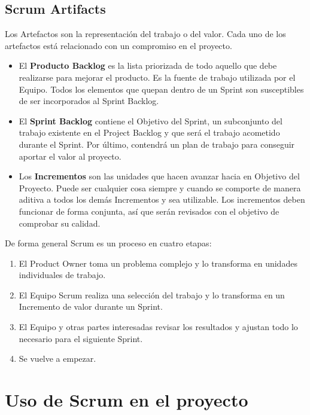 \subsection{Scrum Artifacts}

Los Artefactos son la representación del trabajo o del valor. Cada uno de los artefactos está relacionado con un compromiso en el proyecto.

\begin{itemize}
    \item El \textbf{Producto Backlog} es la lista priorizada de todo aquello que debe realizarse para mejorar el producto. Es la fuente de trabajo utilizada por el Equipo. Todos los elementos que quepan dentro de un Sprint son susceptibles de ser incorporados al Sprint Backlog.
    \item El \textbf{Sprint Backlog} contiene el Objetivo del Sprint, un subconjunto del trabajo existente en el Project Backlog y que será el trabajo acometido durante el Sprint. Por último, contendrá un plan de trabajo para conseguir aportar el valor al proyecto.
    \item Los \textbf{Incrementos} son las unidades que hacen avanzar hacia en Objetivo del Proyecto. Puede ser cualquier cosa siempre y cuando se comporte de manera aditiva a todos los demás Incrementos y sea utilizable. Los incrementos deben funcionar de forma conjunta, así que serán revisados con el objetivo de comprobar su calidad.
\end{itemize}

De forma general Scrum es un proceso en cuatro etapas:

\begin{enumerate}
    \item El Product Owner toma un problema complejo y lo transforma en unidades individuales de trabajo.
    \item El Equipo Scrum realiza una selección del trabajo y lo transforma en un Incremento de valor durante un Sprint.
    \item El Equipo y otras partes interesadas revisar los resultados y ajustan todo lo necesario para el siguiente Sprint.
    \item Se vuelve a empezar.
\end{enumerate}

\section{Uso de Scrum en el proyecto}
\label{sec:uso-scrum-en-el-proyecto}


